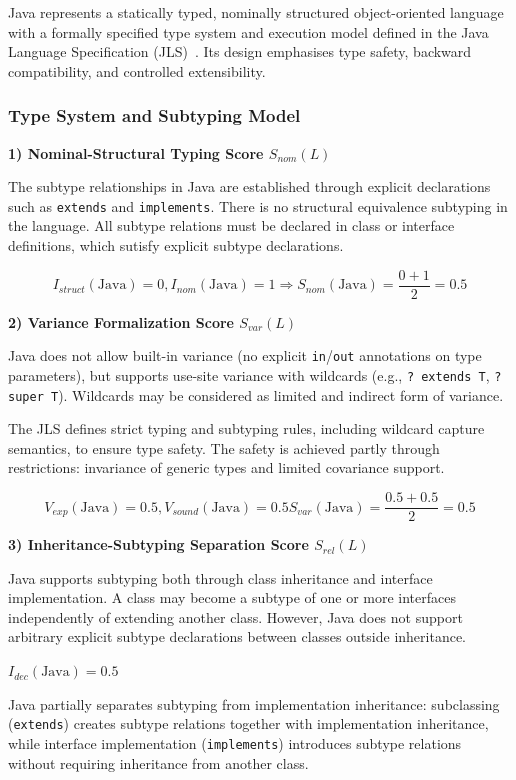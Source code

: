 Java represents a statically typed, nominally structured object-oriented language with a formally specified type system and execution model defined in the Java Language Specification (JLS)~\cite{gosling2015java}. Its design emphasises type safety, backward compatibility, and controlled extensibility.

\subsubsection{Type System and Subtyping Model}

\textbf{1) Nominal-Structural Typing Score $S_{nom}(L)$}

The subtype relationships in Java are established through explicit declarations such as \texttt{extends} and \texttt{implements}. There is no structural equivalence subtyping in the language. All subtype relations must be declared in class or interface definitions, which sutisfy explicit subtype declarations. 

\[
    I_{struct}(\text{Java}) = 0, I_{nom}(\text{Java}) = 1 
    \Rightarrow S_{nom}(\text{Java}) = \frac{0 + 1}{2} = 0.5
\]


\textbf{2) Variance Formalization Score $S_{var}(L)$}

Java does not allow built-in variance (no explicit \texttt{in}/\texttt{out} annotations on type parameters), but supports use-site variance with wildcards (e.g., \texttt{? extends T}, \texttt{? super T}). Wildcards may be considered as limited and indirect form of variance. 

The JLS defines strict typing and subtyping rules, including wildcard capture semantics, to ensure type safety. The safety is achieved partly through restrictions: invariance of generic types and limited covariance support.

\[
    V_{exp}(\text{Java}) = 0.5, V_{sound}(\text{Java}) = 0.5  S_{var}(\text{Java}) = \frac{0.5 + 0.5}{2} = 0.5
\]


\textbf{3) Inheritance-Subtyping Separation Score $S_{rel}(L)$}

Java supports subtyping both through class inheritance and interface implementation. A class may become a subtype of one or more interfaces independently of extending another class. However, Java does not support arbitrary explicit subtype declarations between classes outside inheritance.

$I_{dec}(\text{Java}) = 0.5$

Java partially separates subtyping from implementation inheritance: subclassing (\texttt{extends}) creates subtype relations together with implementation inheritance, while interface implementation (\texttt{implements}) introduces subtype relations without requiring inheritance from another class.

